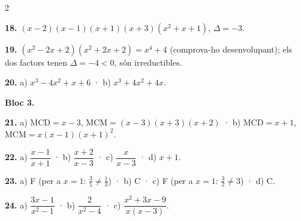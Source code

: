 \documentclass[13pt,a4paper]{extarticle}
\begin{document}
\begin{multicols}{2}
\begin{minipage}{\linewidth}
\textbf{18.} $(x-2)(x-1)(x+1)(x+3)(x^2+x+1)$, $\Delta=-3$.\par
\end{minipage}\par\vspace{1.6mm}
\par\noindent\begin{minipage}{\linewidth}
\textbf{19.} $(x^2-2x+2)(x^2+2x+2)=x^4+4$ (comprova-ho desenvolupant); els dos factors tenen $\Delta=-4<0$, són irreductibles.\par
\end{minipage}\par\vspace{1.6mm}
\par\noindent\begin{minipage}{\linewidth}
\textbf{20.} a) $x^3-4x^2+x+6$ · b) $x^3+4x^2+4x$.\par
\end{minipage}\par\vspace{1.6mm}
\textbf{Bloc 3.}\par
\par\noindent\begin{minipage}{\linewidth}
\textbf{21.} a) MCD$=x-3$, MCM$=(x-3)(x+3)(x+2)$ · b) MCD$=x+1$, MCM$=x(x-1)(x+1)^2$.\par
\end{minipage}\par\vspace{1.6mm}
\par\noindent\begin{minipage}{\linewidth}
\textbf{22.} a) $\dfrac{x-1}{x+1}$ · b) $\dfrac{x+2}{x-3}$ · c) $\dfrac{x}{x-3}$ · d) $x+1$.\par
\end{minipage}\par\vspace{1.6mm}
\par\noindent\begin{minipage}{\linewidth}
\textbf{23.} a) F (per a $x=1$: $\frac35\neq\frac13$) · b) C · c) F (per a $x=1$: $\frac32\neq3$) · d) C.\par
\end{minipage}\par\vspace{1.6mm}
\par\noindent\begin{minipage}{\linewidth}
\textbf{24.} a) $\dfrac{3x-1}{x^2-1}$ · b) $\dfrac{2}{x^2-4}$ · c) $\dfrac{x^2+3x-9}{x(x-3)}$.\par

\end{minipage}
\end{multicols}
\end{document}
